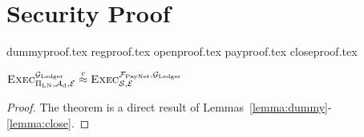 \section{Security Proof}
  {dummyproof.tex}
  {regproof.tex}
  {openproof.tex}
  {payproof.tex}
  {closeproof.tex}

  \begin{theorem}
    \label{theorem:simulation}
    \center $\textsc{Exec}^{\mathcal{G}_{\mathrm{Ledger}}}_{\Pi_{\mathrm{LN}},
    \mathcal{A}_{\mathrm{d}}, \mathcal{E}} \overset{c}{\approx}
    \textsc{Exec}^{\mathcal{F}_{\mathrm{PayNet}}, \mathcal{G}_{\mathrm{Ledger}}}_{\mathcal{S}, \mathcal{E}}$
  \end{theorem}

  \begin{proof}
    The theorem is a direct result of
    Lemmas~\ref{lemma:dummy}-\ref{lemma:close}.
  \end{proof}
